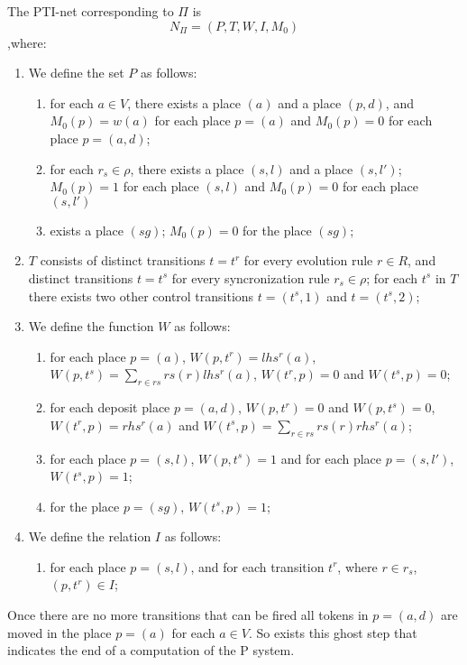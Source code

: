 \begin{definition}
The PTI-net corresponding to $\Pi$ is 
\[ N_\Pi = (P,T,W,I,M_0) \]
,where:

\begin{enumerate}
  
  \item We define the set $P$ as follows:
  \begin{enumerate}
     \item for each $a \in V$, there exists a place $(a)$ and a place $(p,d)$, and 
     $M_0(p)=w(a)$ for each place $p=(a)$ and $M_0(p)=0$ for each place $p=(a,d)$;
     \item for each $r_s \in \rho$, there exists a place $(s,l)$ and a place $(s,l')$;
     $M_0(p)=1$ for each place $(s,l)$ and $M_0(p)=0$ for each place $(s,l')$
     \item exists a place $(sg)$; $M_0(p)=0$ for the place $(sg)$;
   \end{enumerate}
    
    \item $T$ consists of distinct transitions $t=t^r$ for every evolution rule $r \in R$, and 
    distinct transitions $t=t^s$ for every syncronization rule $r_s \in \rho$;
    for each $t^s$ in $T$ there exists two other control transitions $t=(t^s,1)$ and $t=(t^s,2)$;
    
    \item We define the function $W$ as follows:
    \begin{enumerate}
        \item for each place $p=(a)$, $W(p,t^r)=lhs^r(a)$, $W(p,t^s)=\sum_{r \in rs} rs(r)lhs^r(a)$, $W(t^r,p)=0$ and $W(t^s,p)=0$;
        \item for each deposit place $p=(a,d)$, $W(p,t^r)=0$ and $W(p,t^s)=0$, $W(t^r,p)=rhs^r(a)$ and $W(t^s,p)=\sum_{r \in rs} rs(r)rhs^r(a)$;
        \item for each place $p=(s,l)$, $W(p,t^s)=1$ and for each place $p=(s,l')$, $W(t^s,p)=1$;
        \item for the place $p=(sg)$, $W(t^s,p)=1$;
    \end{enumerate}

    \item We define the relation $I$ as follows:
    \begin{enumerate}
        \item for each place $p=(s,l)$, and for each transition $t^r$, where $r \in r_s$, 
        $(p,t^r) \in I$;
    \end{enumerate}
    
\end{enumerate}
\end{definition}

Once there are no more transitions that can be fired all tokens in $p=(a,d)$ are moved in the place $p=(a)$ for each $a \in V$. So exists this ghost step that indicates the end of a computation of the P system. 